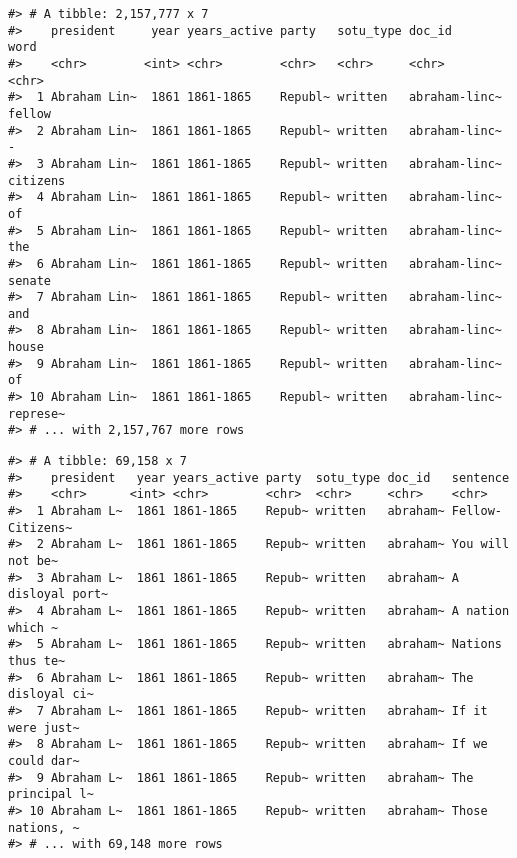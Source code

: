 \documentclass[]{book}
\newenvironment{Shaded}{\begin{snugshade}}{\end{snugshade}}
\newcommand{\CommentTok}[1]{\textcolor[rgb]{0.56,0.35,0.01}{\textit{#1}}}
\newcommand{\DataTypeTok}[1]{\textcolor[rgb]{0.13,0.29,0.53}{#1}}
\newcommand{\KeywordTok}[1]{\textcolor[rgb]{0.13,0.29,0.53}{\textbf{#1}}}
\newcommand{\NormalTok}[1]{#1}
\newcommand{\OperatorTok}[1]{\textcolor[rgb]{0.81,0.36,0.00}{\textbf{#1}}}
\newcommand{\OtherTok}[1]{\textcolor[rgb]{0.56,0.35,0.01}{#1}}
\newcommand{\StringTok}[1]{\textcolor[rgb]{0.31,0.60,0.02}{#1}}
\begin{document}
\begin{verbatim}
#> # A tibble: 2,157,777 x 7
#>    president     year years_active party   sotu_type doc_id        word    
#>    <chr>        <int> <chr>        <chr>   <chr>     <chr>         <chr>   
#>  1 Abraham Lin~  1861 1861-1865    Republ~ written   abraham-linc~ fellow  
#>  2 Abraham Lin~  1861 1861-1865    Republ~ written   abraham-linc~ -       
#>  3 Abraham Lin~  1861 1861-1865    Republ~ written   abraham-linc~ citizens
#>  4 Abraham Lin~  1861 1861-1865    Republ~ written   abraham-linc~ of      
#>  5 Abraham Lin~  1861 1861-1865    Republ~ written   abraham-linc~ the     
#>  6 Abraham Lin~  1861 1861-1865    Republ~ written   abraham-linc~ senate  
#>  7 Abraham Lin~  1861 1861-1865    Republ~ written   abraham-linc~ and     
#>  8 Abraham Lin~  1861 1861-1865    Republ~ written   abraham-linc~ house   
#>  9 Abraham Lin~  1861 1861-1865    Republ~ written   abraham-linc~ of      
#> 10 Abraham Lin~  1861 1861-1865    Republ~ written   abraham-linc~ represe~
#> # ... with 2,157,767 more rows
\end{verbatim}

\begin{Shaded}
\end{Shaded}

\begin{verbatim}
#> # A tibble: 69,158 x 7
#>    president   year years_active party  sotu_type doc_id   sentence        
#>    <chr>      <int> <chr>        <chr>  <chr>     <chr>    <chr>           
#>  1 Abraham L~  1861 1861-1865    Repub~ written   abraham~ Fellow-Citizens~
#>  2 Abraham L~  1861 1861-1865    Repub~ written   abraham~ You will not be~
#>  3 Abraham L~  1861 1861-1865    Repub~ written   abraham~ A disloyal port~
#>  4 Abraham L~  1861 1861-1865    Repub~ written   abraham~ A nation which ~
#>  5 Abraham L~  1861 1861-1865    Repub~ written   abraham~ Nations thus te~
#>  6 Abraham L~  1861 1861-1865    Repub~ written   abraham~ The disloyal ci~
#>  7 Abraham L~  1861 1861-1865    Repub~ written   abraham~ If it were just~
#>  8 Abraham L~  1861 1861-1865    Repub~ written   abraham~ If we could dar~
#>  9 Abraham L~  1861 1861-1865    Repub~ written   abraham~ The principal l~
#> 10 Abraham L~  1861 1861-1865    Repub~ written   abraham~ Those nations, ~
#> # ... with 69,148 more rows
\end{verbatim}
\end{document}

